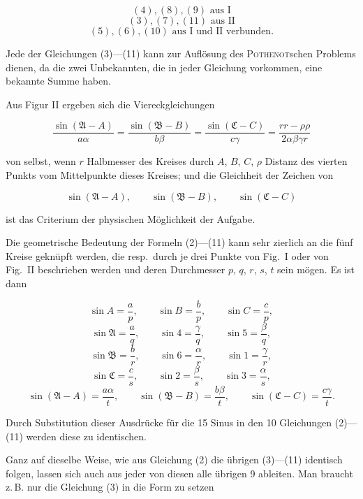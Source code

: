 
\[
(4), (8), (9) \text{ aus I}
\]
\[
(3), (7), (11) \text{ aus II}
\]
\[
(5), (6), (10) \text{ aus I und II verbunden.}
\]

Jede der Gleichungen (3)—(11) kann zur Auflösung des \textsc{Pothenot}schen Problems dienen, da die zwei Unbekannten, die in jeder Gleichung vorkommen, eine bekannte Summe haben.

Aus Figur II ergeben sich die Viereckgleichungen

\[
\frac{\sin(\mathfrak{A}-A)}{a\alpha} = \frac{\sin(\mathfrak{B}-B)}{b\beta} = \frac{\sin(\mathfrak{C}-C)}{c\gamma} = \frac{rr-\rho\rho}{2\alpha\beta\gamma r}
\]

von selbst, wenn $r$ Halbmesser des Kreises durch $A$, $B$, $C$, $\rho$ Distanz des vierten Punkts vom Mittelpunkte dieses Kreises; und die Gleichheit der Zeichen von

\[
\sin(\mathfrak{A}-A), \qquad \sin(\mathfrak{B}-B), \qquad \sin(\mathfrak{C}-C)
\]

ist das Criterium der physischen Möglichkeit der Aufgabe.

Die geometrische Bedeutung der Formeln (2)—(11) kann sehr zierlich an die fünf Kreise geknüpft werden, die resp.\ durch je drei Punkte von Fig.\ I oder von Fig.\ II beschrieben werden und deren Durchmesser $p$, $q$, $r$, $s$, $t$ sein mögen. Es ist dann

\[
\sin A = \frac{a}{p}, \qquad \sin B = \frac{b}{p}, \qquad \sin C = \frac{c}{p},
\]
\[
\sin\mathfrak{A} = \frac{a}{q}, \qquad \sin 4 = \frac{\gamma}{q}, \qquad \sin 5 = \frac{\beta}{q},
\]
\[
\sin\mathfrak{B} = \frac{b}{r}, \qquad \sin 6 = \frac{\alpha}{r}, \qquad \sin 1 = \frac{\gamma}{r},
\]
\[
\sin\mathfrak{C} = \frac{c}{s}, \qquad \sin 2 = \frac{\beta}{s}, \qquad \sin 3 = \frac{\alpha}{s},
\]
\[
\sin(\mathfrak{A}-A) = \frac{a\alpha}{t}, \qquad \sin(\mathfrak{B}-B) = \frac{b\beta}{t}, \qquad \sin(\mathfrak{C}-C) = \frac{c\gamma}{t}.
\]

Durch Substitution dieser Ausdrücke für die 15 Sinus in den 10 Gleichungen (2)—(11) werden diese zu identischen.

Ganz auf dieselbe Weise, wie aus Gleichung (2) die übrigen (3)—(11) identisch folgen, lassen sich auch aus jeder von diesen alle übrigen 9 ableiten. Man braucht z.\,B. nur die Gleichung (3) in die Form zu setzen
